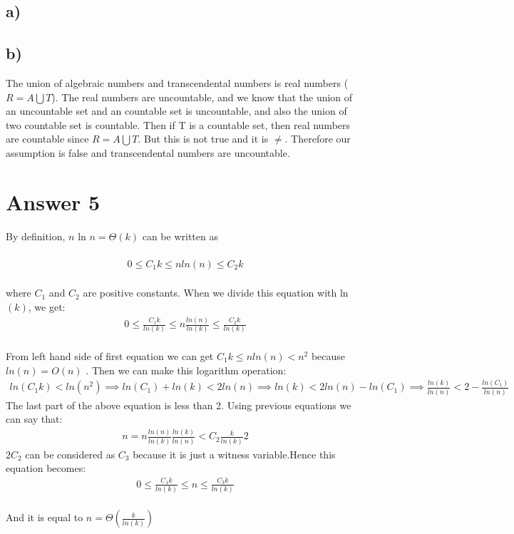 \documentclass[12pt]{article}
\begin{document}
\subsection*{a)}

\subsection*{b)}
The union of algebraic numbers and transcendental numbers is real numbers ($R=A\bigcup T$). The real numbers are uncountable, and we know that the union of an uncountable set and an countable set is uncountable, and also the union of two countable set is countable. Then if T is a countable set, then real numbers are countable since $R=A\bigcup T$. But this is not true and it is $\neq$. Therefore our assumption is false and transcendental numbers are uncountable.
\section*{Answer 5}
By definition, $n$ ln $n = \Theta(k)$ can be written as \\ \\
\begin{equation} 
\label{eq1}
\begin{split}
0 \leq C_1k \leq n ln(n) \leq C_2k             
\end{split}
\end{equation}
\\ where $C_1$ and $C_2$ are positive constants. When we divide this equation with ln$(k)$, we get:
\begin{equation} 
\label{eq1}
\begin{split}
0 \leq \frac{C_1k}{ln (k)} \leq n\frac{ln (n)}{ln (k)} \leq \frac{C_2k}{ln (k)}             
\end{split}
\end{equation}
\\From left hand side of first equation we can get $C_1k \leq n ln(n) < n^2$ because $ln(n)=O(n)$ . Then we can make this logarithm operation:
\begin{equation} 
\label{eq1}
\begin{split}
ln(C_1k)<ln(n^2) \implies ln(C_1)+ln(k) < 2ln(n) \implies ln(k) < 2ln(n)-ln(C_1) \implies \frac{ln(k)}{ln(n)} < 2 - \frac{ln(C_1)}{ln(n)}
\end{split}
\end{equation}
The last part of the above equation is less than 2. Using previous equations we can say that:
\begin{equation} 
\label{eq1}
\begin{split}
n = n \frac{ln(n)}{ln(k)} \frac{ln(k)}{ln(n)} < C_2\frac{k}{ln(k)}2
\end{split}
\end{equation}
$2C_2$ can be considered as $C_3$ because it is just a witness variable.Hence this equation becomes:
\begin{equation} 
\label{eq1}
\begin{split}
0 \leq \frac{C_1k}{ln (k)} \leq n \leq \frac{C_3k}{ln (k)}  
\end{split}
\end{equation}
\\ And it is equal to $n =\Theta(\frac{k}{ln(k)})$
\end{document}
